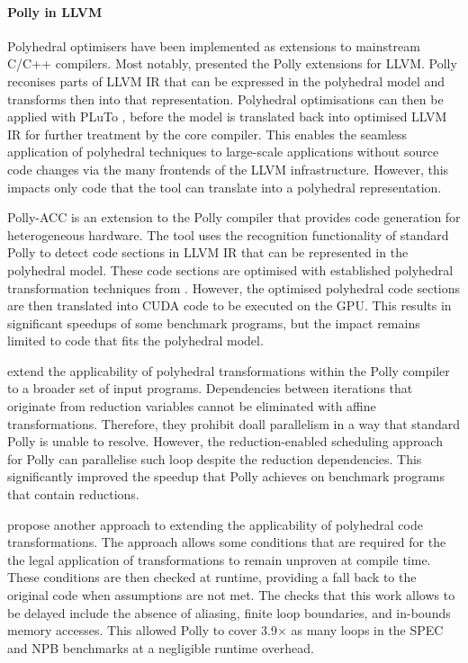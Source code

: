     \paragraph*{Polly in LLVM}
    Polyhedral optimisers have been implemented as extensions to mainstream
    C/C++ compilers.
    Most notably, \citet{Lengauer2012Polly} presented the Polly extensions for
    LLVM.
    Polly reconises parts of LLVM IR that can be expressed in the polyhedral
    model and transforms then into that representation.
    Polyhedral optimisations can then be applied with PLuTo
    \citep{Bondhugula:2008:PAP:1375581.1375595}, before the model is
    translated back into optimised LLVM IR for further treatment by the core
    compiler.
    This enables the seamless application of polyhedral techniques to
    large-scale applications without source code changes via the many
    frontends of the LLVM infrastructure.
    However, this impacts only code that the tool can translate
    into a polyhedral representation.

    Polly-ACC \citep{polly-acc} is an extension to the Polly compiler that
    provides code generation for heterogeneous hardware.
    The tool uses the recognition functionality of standard Polly to detect
    code sections in LLVM IR that can be represented in the polyhedral model.
    These code sections are optimised with established polyhedral
    transformation techniques from \citet{Lengauer2012Polly}.
    However, the optimised polyhedral code sections are then translated into
    CUDA code to be executed on the GPU.
    This results in significant speedups of some benchmark programs, but the
    impact remains limited to code that fits the polyhedral model.

    \citet{Doerfert2015Polly} extend the applicability of polyhedral
    transformations within the Polly compiler to a broader set of input
    programs.
    Dependencies between iterations that originate from reduction variables
    cannot be eliminated with affine transformations.
    Therefore, they prohibit doall parallelism in a way that standard Polly is
    unable to resolve.
    However, the reduction-enabled scheduling approach for Polly can parallelise
    such loop despite the reduction dependencies.
    This significantly improved the speedup that Polly achieves on benchmark
    programs that contain reductions.

    \citet{Doerfert:2017:OLO:3049832.3049864} propose another approach to
    extending the applicability of polyhedral code transformations.
    The approach allows some conditions that are required for the the legal
    application of transformations to remain unproven at compile time.
    These conditions are then checked at runtime, providing a fall back to the
    original code when assumptions are not met.
    The checks that this work allows to be delayed include the absence of
    aliasing, finite loop boundaries, and in-bounds memory accesses.
    This allowed Polly to cover 3.9$\times$ as many loops in the SPEC and NPB
    benchmarks at a negligible runtime overhead.

